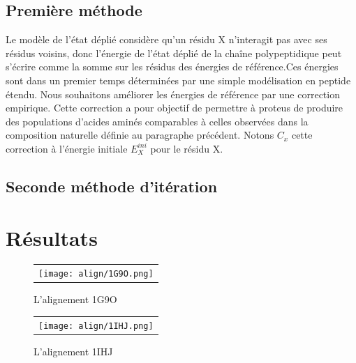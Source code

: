     \clearpage


\subsection{Première méthode}

Le modèle de l'état déplié considère qu'un résidu X n’interagit pas avec ses résidus voisins, donc l'énergie de l'état déplié de la chaîne polypeptidique peut s'écrire comme la somme sur les résidus des énergies de référence.Ces énergies sont dans un premier temps déterminées par une simple modélisation en peptide étendu.
 Nous souhaitons améliorer les énergies de référence par une correction empirique. Cette correction a pour objectif de permettre à proteus de produire des populations d'acides aminés comparables à celles observées dans la composition naturelle définie au paragraphe précédent.
Notons $C_x$ cette correction à l'énergie initiale $E_X^{ini}$ pour le résidu X.




\subsection{Seconde méthode d'itération}

\section{Résultats} 



    \clearpage

   \begin{figure}[t]
     \centering
     \begin{tabular}{c}
       \texttt{[image: align/1G9O.png]} \\
     \end{tabular}
     \caption{L'alignement 1G9O }
\label{graph:convEref}
   \end{figure}

    \clearpage

   \begin{figure}[t]
     \centering
     \begin{tabular}{c}
       \texttt{[image: align/1IHJ.png]} \\
     \end{tabular}
     \caption{L'alignement 1IHJ }
\label{graph:convEref}
   \end{figure}

    \clearpage

